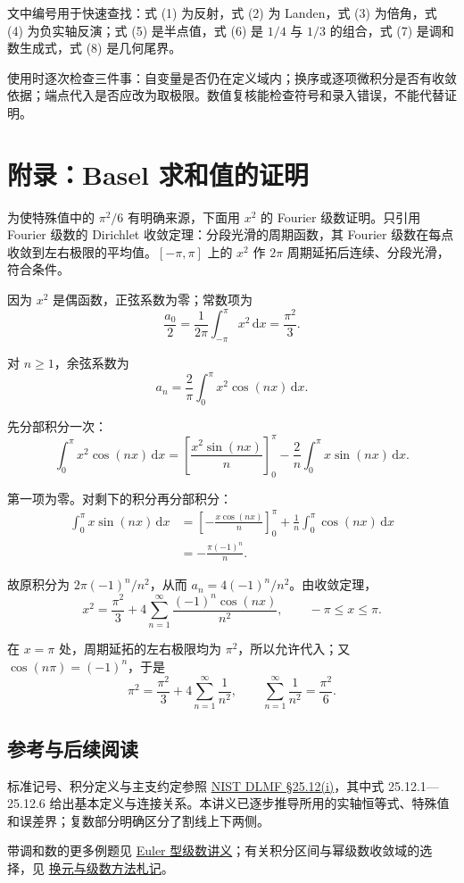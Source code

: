 \documentclass[11pt,a4paper]{article}
\begin{document}
文中编号用于快速查找：式 (1) 为反射，式 (2) 为 Landen，式 (3) 为倍角，式
(4) 为负实轴反演；式 (5) 是半点值，式 (6) 是 \(1/4\) 与 \(1/3\)
的组合，式 (7) 是调和数生成式，式 (8) 是几何尾界。

使用时逐次检查三件事：自变量是否仍在定义域内；换序或逐项微积分是否有收敛依据；端点代入是否应改为取极限。数值复核能检查符号和录入错误，不能代替证明。

\hypertarget{ux9644ux5f55basel-ux6c42ux548cux503cux7684ux8bc1ux660e}{%
\section{附录：Basel
求和值的证明}\label{ux9644ux5f55basel-ux6c42ux548cux503cux7684ux8bc1ux660e}}

为使特殊值中的 \(\pi^2/6\) 有明确来源，下面用 \(x^2\) 的 Fourier
级数证明。只引用 Fourier 级数的 Dirichlet
收敛定理：分段光滑的周期函数，其 Fourier
级数在每点收敛到左右极限的平均值。\([-\pi,\pi]\) 上的 \(x^2\) 作
\(2\pi\) 周期延拓后连续、分段光滑，符合条件。

因为 \(x^2\) 是偶函数，正弦系数为零；常数项为
\[
\frac{a_0}{2}=\frac1{2\pi}\int_{-\pi}^{\pi}x^2\,\mathrm dx
=\frac{\pi^2}{3}.
\]

对 \(n\geqslant1\)，余弦系数为
\[
a_n=\frac2\pi\int_0^{\pi}x^2\cos(nx)\,\mathrm dx.
\]

先分部积分一次：
\[
\int_0^{\pi}x^2\cos(nx)\,\mathrm dx
=\left[\frac{x^2\sin(nx)}n\right]_0^{\pi}
-\frac2n\int_0^{\pi}x\sin(nx)\,\mathrm dx.
\]

第一项为零。对剩下的积分再分部积分：
\[
\begin{aligned}
\int_0^{\pi}x\sin(nx)\,\mathrm dx
&=\left[-\frac{x\cos(nx)}n\right]_0^{\pi}
+\frac1n\int_0^{\pi}\cos(nx)\,\mathrm dx\\
&=-\frac{\pi(-1)^n}{n}.
\end{aligned}
\]

故原积分为 \(2\pi(-1)^n/n^2\)，从而 \(a_n=4(-1)^n/n^2\)。由收敛定理，
\[
x^2=\frac{\pi^2}{3}+4\sum_{n=1}^{\infty}\frac{(-1)^n\cos(nx)}{n^2},
\qquad -\pi\leqslant x\leqslant\pi.
\]

在 \(x=\pi\) 处，周期延拓的左右极限均为 \(\pi^2\)，所以允许代入；又
\(\cos(n\pi)=(-1)^n\)，于是
\[
\pi^2=\frac{\pi^2}{3}+4\sum_{n=1}^{\infty}\frac1{n^2},
\qquad
\sum_{n=1}^{\infty}\frac1{n^2}=\frac{\pi^2}{6}.
\]

\hypertarget{ux53c2ux8003ux4e0eux540eux7eedux9605ux8bfb}{%
\subsection{参考与后续阅读}\label{ux53c2ux8003ux4e0eux540eux7eedux9605ux8bfb}}

标准记号、积分定义与主支约定参照
\href{https://dlmf.nist.gov/25.12\#i}{NIST DLMF §25.12(i)}，其中式
25.12.1---25.12.6
给出基本定义与连接关系。本讲义已逐步推导所用的实轴恒等式、特殊值和误差界；复数部分明确区分了割线上下两侧。

带调和数的更多例题见
\href{https://zj139.github.io/math-notes/notes/890e1516e64e21a2fb2248b4/}{Euler
型级数讲义}；有关积分区间与幂级数收敛域的选择，见
\href{https://zj139.github.io/math-notes/essays/e171823ae7848bf83c108276/}{换元与级数方法札记}。
\end{document}

